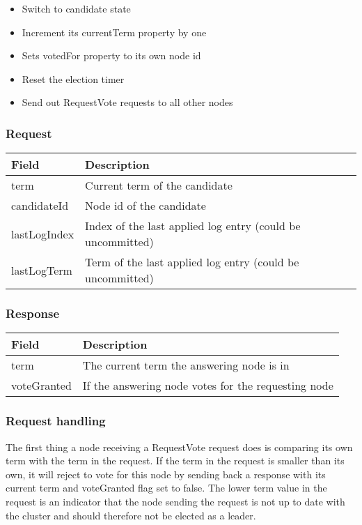 \begin{itemize}
    \item Switch to candidate state
    \item Increment its currentTerm property by one
    \item Sets votedFor property to its own node id
    \item Reset the election timer
    \item Send out RequestVote requests to all other nodes
\end{itemize}

\subsubsection*{Request}

\begin{tabularx}{\textwidth}{ | p{80px} | X | }
\hline
\textbf{Field} & \textbf{Description} \\ \hline
term & Current term of the candidate \\ \hline
candidateId & Node id of the candidate \\ \hline
lastLogIndex & Index of the last applied log entry (could be uncommitted) \\ \hline
lastLogTerm & Term of the last applied log entry (could be uncommitted) \\ \hline
\end{tabularx}

\subsubsection*{Response}

\begin{tabularx}{\textwidth}{ | p{80px} | X | }
\hline
\textbf{Field} & \textbf{Description} \\ \hline
term & The current term the answering node is in \\ \hline
voteGranted & If the answering node votes for the requesting node \\ \hline
\end{tabularx}

\subsubsection*{Request handling}

The first thing a node receiving a RequestVote request does is comparing its own term with the term in the request. If the term in the request is smaller than its own, it will reject to vote for this node by sending back a response with its current term and voteGranted flag set to false. The lower term value in the request is an indicator that the node sending the request is not up to date with the cluster and should therefore not be elected as a leader.

